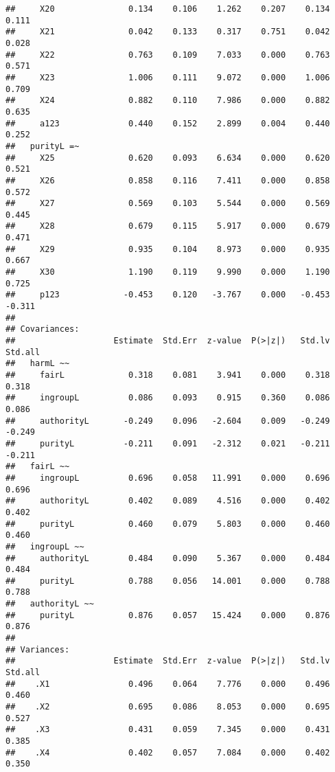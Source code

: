 \documentclass[english,man]{apa6}
\newcounter{author}
\theoremstyle{definition}
\theoremstyle{definition}
\theoremstyle{definition}
\theoremstyle{remark}
\begin{document}
\begin{verbatim}
##     X20               0.134    0.106    1.262    0.207    0.134    0.111
##     X21               0.042    0.133    0.317    0.751    0.042    0.028
##     X22               0.763    0.109    7.033    0.000    0.763    0.571
##     X23               1.006    0.111    9.072    0.000    1.006    0.709
##     X24               0.882    0.110    7.986    0.000    0.882    0.635
##     a123              0.440    0.152    2.899    0.004    0.440    0.252
##   purityL =~                                                            
##     X25               0.620    0.093    6.634    0.000    0.620    0.521
##     X26               0.858    0.116    7.411    0.000    0.858    0.572
##     X27               0.569    0.103    5.544    0.000    0.569    0.445
##     X28               0.679    0.115    5.917    0.000    0.679    0.471
##     X29               0.935    0.104    8.973    0.000    0.935    0.667
##     X30               1.190    0.119    9.990    0.000    1.190    0.725
##     p123             -0.453    0.120   -3.767    0.000   -0.453   -0.311
## 
## Covariances:
##                    Estimate  Std.Err  z-value  P(>|z|)   Std.lv  Std.all
##   harmL ~~                                                              
##     fairL             0.318    0.081    3.941    0.000    0.318    0.318
##     ingroupL          0.086    0.093    0.915    0.360    0.086    0.086
##     authorityL       -0.249    0.096   -2.604    0.009   -0.249   -0.249
##     purityL          -0.211    0.091   -2.312    0.021   -0.211   -0.211
##   fairL ~~                                                              
##     ingroupL          0.696    0.058   11.991    0.000    0.696    0.696
##     authorityL        0.402    0.089    4.516    0.000    0.402    0.402
##     purityL           0.460    0.079    5.803    0.000    0.460    0.460
##   ingroupL ~~                                                           
##     authorityL        0.484    0.090    5.367    0.000    0.484    0.484
##     purityL           0.788    0.056   14.001    0.000    0.788    0.788
##   authorityL ~~                                                         
##     purityL           0.876    0.057   15.424    0.000    0.876    0.876
## 
## Variances:
##                    Estimate  Std.Err  z-value  P(>|z|)   Std.lv  Std.all
##    .X1                0.496    0.064    7.776    0.000    0.496    0.460
##    .X2                0.695    0.086    8.053    0.000    0.695    0.527
##    .X3                0.431    0.059    7.345    0.000    0.431    0.385
##    .X4                0.402    0.057    7.084    0.000    0.402    0.350

\end{verbatim}
\end{document}
